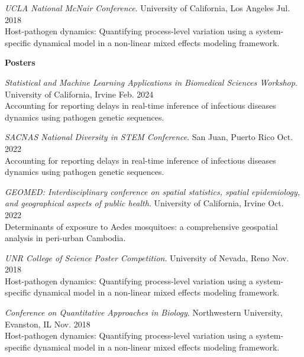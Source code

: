 \documentclass{article}
\begin{document}
\begin{description}
		\textit{UCLA National McNair Conference}. University of California, Los Angeles \hfill{Jul. 2018}\\
		Host-pathogen dynamics: Quantifying process-level variation using a system-specific dynamical model in a non-linear mixed effects modeling framework.
		\vspace*{1mm}
		
		\setlength{\leftskip}{0cm}
		
		
		
		\textbf{Posters}
		
		\setlength{\leftskip}{0.5cm}
		
		\vspace*{1mm}	
		
		\textit{Statistical and Machine Learning Applications in Biomedical Sciences Workshop}. University of California, Irvine \hfill{Feb. 2024}\\
		Accounting for reporting delays in real-time inference of infectious diseases dynamics using pathogen genetic sequences.
		\vspace*{1mm}
		
		\textit{SACNAS National Diversity in STEM Conference}. San Juan, Puerto Rico \hfill{Oct. 2022}\\
		Accounting for reporting delays in real-time inference of infectious diseases dynamics using pathogen genetic sequences.
		\vspace*{1mm}
		
		\textit{GEOMED: Interdisciplinary conference on spatial statistics, spatial epidemiology, and geographical aspects of public health}. University of California, Irvine \hfill{Oct. 2022}\\
		Determinants of exposure to Aedes mosquitoes: a comprehensive geospatial analysis in peri-urban Cambodia.
		\vspace*{1mm}
		
		\textit{UNR College of Science Poster Competition}. University of Nevada, Reno \hfill{Nov. 2018}\\
		Host-pathogen dynamics: Quantifying process-level variation using a system-specific dynamical model in a non-linear mixed effects modeling framework.
		\vspace*{1mm}
		
		\textit{Conference on Quantitative Approaches in Biology}. Northwestern University, Evanston, IL \hfill{Nov. 2018}\\
		Host-pathogen dynamics: Quantifying process-level variation using a system-specific dynamical model in a non-linear mixed effects modeling framework. 
		\vspace*{1mm}
		

\end{description}
\end{document}
